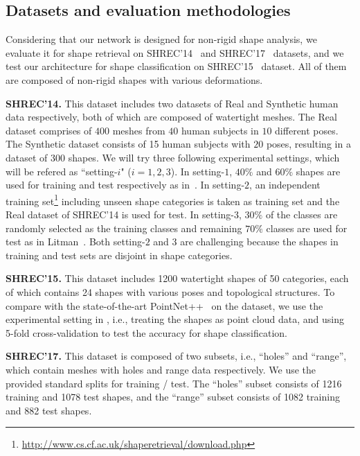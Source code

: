 \documentclass[runningheads]{llncs}
\begin{document}
\subsection{Datasets and evaluation methodologies}
Considering that our network is designed for non-rigid shape analysis, we evaluate it for shape retrieval on SHREC'14~\cite{SHREC} and SHREC'17~\cite{Masoumi2017SHREC} datasets, and we test our architecture for shape classification on SHREC'15~\cite{Lian2015SHREC} dataset. All of them  are composed of non-rigid shapes with various deformations.

\noindent
\textbf{SHREC'14.}  This dataset includes two datasets of Real and Synthetic human data respectively, both of which are composed of watertight meshes. The Real dataset comprises of $400$ meshes from $40$ human subjects in $10$ different poses. The Synthetic dataset consists of 15 human subjects with $20$ poses, resulting in a dataset of 300 shapes.  We will try three following experimental settings, which will be refered as ``setting-$i$" ($i =1, 2, 3$). In setting-$1$, $40\%$ and $60\%$ shapes are used for training and test respectively as in~\cite{Ioannis}. In setting-$2$, an independent training set\footnote{\url{http://www.cs.cf.ac.uk/shaperetrieval/download.php}} including unseen shape categories is taken as training set and the Real dataset of SHREC'14 is used for test. In setting-3,  $30\%$ of the classes are randomly selected as the training classes and remaining $70\%$ classes are used for test as in  Litman~\cite{SHREC}. Both setting-$2$ and $3$ are challenging because the shapes in training and test sets are disjoint  in shape categories.

\noindent
\textbf{SHREC'15.} This dataset includes 1200 watertight shapes of 50 categories, each of which contains 24 shapes with various poses and topological structures. To compare with the state-of-the-art PointNet++~\cite{qi2017pointnetplusplus} on the dataset, we use the experimental setting in \cite{qi2017pointnetplusplus}, i.e., treating the shapes as point cloud data, and using 5-fold cross-validation to test the accuracy for shape classification. 

\noindent
\textbf{SHREC'17.} This dataset is composed of two subsets, i.e., ``holes'' and ``range'', which contain meshes with holes and range data respectively.  
We use the provided standard splits for training / test. The ``holes'' subset consists of 1216 training and 1078 test shapes, and the ``range'' subset consists of 1082 training and 882 test shapes.
\end{document}
